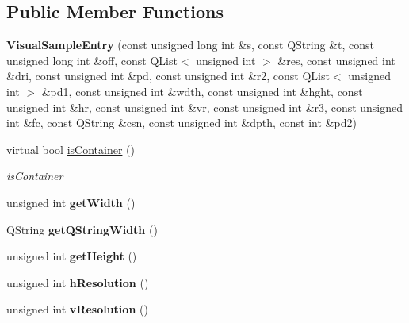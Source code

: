 \subsection*{Public Member Functions}
\begin{DoxyCompactItemize}
\item 
\hypertarget{class_visual_sample_entry_a0bf8b344cc60a01b1ec6ad49d39588cc}{{\bfseries Visual\-Sample\-Entry} (const unsigned long int \&s, const Q\-String \&t, const unsigned long int \&off, const Q\-List$<$ unsigned int $>$ \&res, const unsigned int \&dri, const unsigned int \&pd, const unsigned int \&r2, const Q\-List$<$ unsigned int $>$ \&pd1, const unsigned int \&wdth, const unsigned int \&hght, const unsigned int \&hr, const unsigned int \&vr, const unsigned int \&r3, const unsigned int \&fc, const Q\-String \&csn, const unsigned int \&dpth, const int \&pd2)}\label{class_visual_sample_entry_a0bf8b344cc60a01b1ec6ad49d39588cc}

\item 
virtual bool \hyperlink{class_visual_sample_entry_a212a8d19ecf3236a8951c0161a85a72d}{is\-Container} ()
\begin{DoxyCompactList}\small\item\em is\-Container \end{DoxyCompactList}\item 
\hypertarget{class_visual_sample_entry_a0e83bd9b524461e138d6b011e7715101}{unsigned int {\bfseries get\-Width} ()}\label{class_visual_sample_entry_a0e83bd9b524461e138d6b011e7715101}

\item 
\hypertarget{class_visual_sample_entry_ae7a024ddbbde30e79520573e581d09b8}{Q\-String {\bfseries get\-Q\-String\-Width} ()}\label{class_visual_sample_entry_ae7a024ddbbde30e79520573e581d09b8}

\item 
\hypertarget{class_visual_sample_entry_a05718fa0fba5518bc2327239fd76b389}{unsigned int {\bfseries get\-Height} ()}\label{class_visual_sample_entry_a05718fa0fba5518bc2327239fd76b389}

\item 
\hypertarget{class_visual_sample_entry_a184681441a3744e4bfc6a586da212673}{unsigned int {\bfseries h\-Resolution} ()}\label{class_visual_sample_entry_a184681441a3744e4bfc6a586da212673}

\item 
\hypertarget{class_visual_sample_entry_ad2aed084f5850856e87782012976b5dd}{unsigned int {\bfseries v\-Resolution} ()}\label{class_visual_sample_entry_ad2aed084f5850856e87782012976b5dd}


\end{DoxyCompactItemize}
